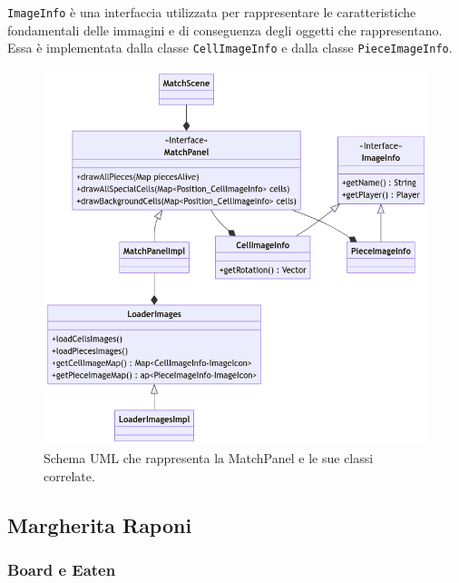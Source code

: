 \documentclass[a4paper,12pt]{report}
\begin{document}
\texttt{ImageInfo} è una interfaccia utilizzata per rappresentare le caratteristiche fondamentali delle immagini e di conseguenza degli oggetti 
che rappresentano. Essa è implementata dalla classe \texttt{CellImageInfo} e dalla classe \texttt{PieceImageInfo}.
\begin{figure}[H]
\centering
\includegraphics[width=\textwidth]{images/match-panel.png}
\caption{Schema UML che rappresenta la MatchPanel e le sue classi correlate.}
\label{images:match-panel}
\end{figure}
\subsection{Margherita Raponi}

\subsubsection{Board e Eaten}
\end{document}
